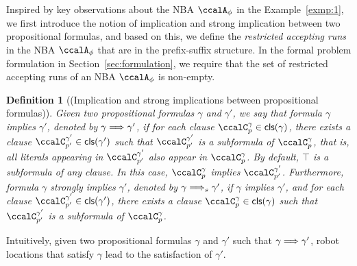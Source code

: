 \documentclass[Afour,sageh,times]{sagej}
\newtheorem{defn}[thm]{Definition}
\newcommand{\clause}[1]{\mathsf{cls}(#1)}
\newcommand{\autop}{\ccalA_{\phi}}
\newcommand{\simplies}{\DOTSB\Longrightarrow}
\begin{document}
 Inspired by key observations about the NBA $\autop$ in the Example~\ref{exmp:1}, we first introduce the notion of implication and strong implication between two propositional formulas, and based on this, we define the {\it restricted accepting runs} in the NBA $\autop$ that are in the prefix-suffix structure. In the formal problem formulation in Section~\ref{sec:formulation}, we require that the set of restricted accepting runs of an NBA $\autop$ is non-empty.

 \begin{defn}[(Implication and strong implications between propositional formulas)]\label{defn:implication}
   Given two propositional formulas $\gamma$ and $\gamma'$, we say that formula  $\gamma$ implies $\gamma'$, denoted by $\gamma \simplies \gamma'$, if for each clause $\ccalC_{p}^{\gamma} \in \clause{\gamma}$, there exists a clause $\ccalC_{p'}^{\gamma'} \in \clause{\gamma'}$ such that  $\ccalC_{p'}^{\gamma'}$ is a subformula of $\ccalC_{p}^{\gamma}$, that is, all literals appearing in $\ccalC_{p'}^{\gamma'}$ also appear in $\ccalC_{p}^{\gamma}$. By default, $\top$ is a subformula of any clause. In this case, $\ccalC_{p}^{\gamma}$ implies $\ccalC_{p'}^{\gamma'}$. Furthermore, formula $\gamma$ strongly implies $\gamma'$, denoted by $\gamma \simplies_s  \gamma'$, if $\gamma$ implies $\gamma'$, and for each clause $\ccalC_{p'}^{\gamma'} \in \clause{\gamma'}$, there exists a clause $\ccalC_{p}^{\gamma} \in \clause{\gamma}$ such that  $\ccalC_{p'}^{\gamma'}$ is a subformula of $\ccalC_{p}^{\gamma}$.
 \end{defn}

 Intuitively, given two propositional formulas $\gamma$ and $\gamma'$ such that $\gamma \simplies \gamma'$, robot locations that satisfy $\gamma$ lead to the satisfaction of $\gamma'$.
\end{document}
